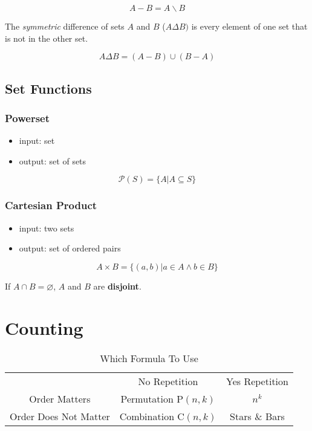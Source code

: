 \documentclass{report}
\begin{document}
\begin{equation}
    A - B = A \backslash B
\end{equation}

The \emph{symmetric} difference of sets $A$ and $B$ ($A \Delta B)$ is every element of one set that is not in the other set.

\begin{equation}
    A \Delta B = (A - B) \cup (B - A)
\end{equation}

\section{Set Functions}

\subsection{Powerset}
\begin{itemize}
    \item input: set
    \item output: set of sets
\end{itemize}

\begin{equation}
    \mathcal{P}(S) = \{A \vert A \subseteq S\}
\end{equation}

\subsection{Cartesian Product}
\begin{itemize}
    \item input: two sets
    \item output: set of ordered pairs
\end{itemize}

\begin{equation}
    A \times B = \{(a, b) | a \in A \wedge b \in B \}
\end{equation}

If $A \cap B = \varnothing$, $A$ and $B$ are \textbf{disjoint}.

\chapter{Counting}

\begin{table}[H]
    \centering
    \begin{tabular}{ccc}
         &  No Repetition& Yes Repetition\\
         Order Matters &  Permutation $\text{P}(n, k)$& $n^k$\\
         Order Does Not Matter &  Combination $\text{C}(n, k)$ & Stars \& Bars\\
    \end{tabular}
    \caption{Which Formula To Use}
    \label{tab:placeholder}
\end{table}
\end{document}
